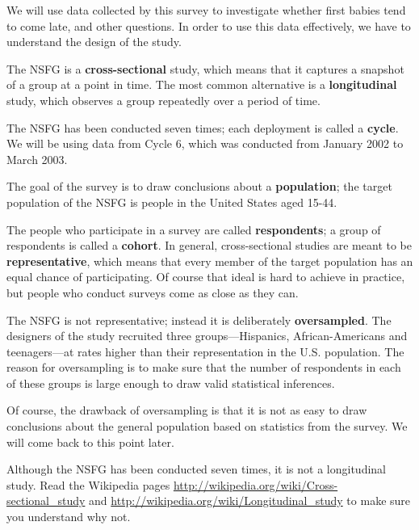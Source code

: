 \documentclass[12pt]{book}
\begin{document}
We will use data collected by this survey to investigate whether first
babies tend to come late, and other questions.  In order to use this
data effectively, we have to understand the design of the study.

The NSFG is a {\bf cross-sectional} study, which means that it
captures a snapshot of a group at a point in time.  The most
common alternative is a {\bf longitudinal} study, which observes a
group repeatedly over a period of time.

The NSFG has been conducted seven times; each deployment is called
a {\bf cycle}.  We will be using data from Cycle 6, which was
conducted from January 2002 to March 2003.

The goal of the survey is to draw conclusions about a
{\bf population}; the target population of the NSFG is people in
the United States aged 15-44.

The people who participate in a survey are called {\bf respondents};
a group of respondents is called a {\bf cohort}.
In general, cross-sectional studies are meant to be {\bf
  representative}, which means that every member of the target
population has an equal chance of participating.  Of course that ideal
is hard to achieve in practice, but people who conduct surveys come as
close as they can.

The NSFG is not representative; instead it is deliberately {\bf
  oversampled}.  The designers of the study recruited three
groups---Hispanics, African-Americans and teenagers---at rates higher
than their representation in the U.S. population.
The reason for oversampling is to make sure that the number of
respondents in each of these groups is large enough to draw valid
statistical inferences.

Of course, the drawback of oversampling is that it is not as easy
to draw conclusions about the general population based on statistics
from the survey.  We will come back to this point later.

\begin{exercise}

Although the NSFG has been conducted seven times, it is not a
longitudinal study.  Read the Wikipedia pages
\url{http://wikipedia.org/wiki/Cross-sectional_study}
and
\url{http://wikipedia.org/wiki/Longitudinal_study}
to make sure you understand why not.

\end{exercise}
\end{document}
